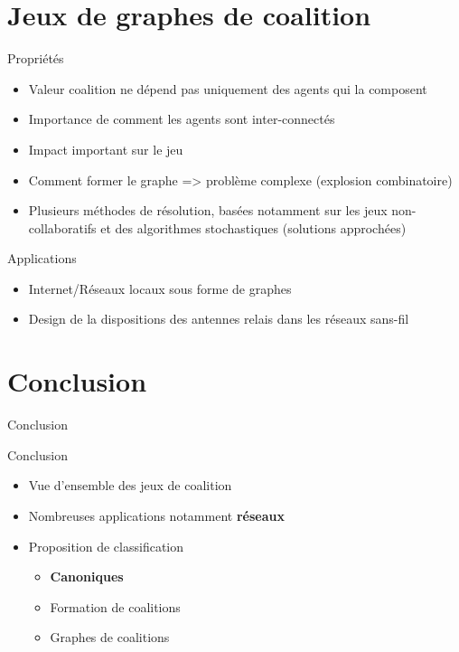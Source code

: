 \documentclass{isimabeamer}
\begin{document}
\section{Jeux de graphes de coalition}
\begin{frame}
\begin{block}{Propriétés}
\begin{itemize}
    \item Valeur coalition ne dépend pas uniquement des agents qui la composent
    \item Importance de comment les agents sont inter-connectés
    \item Impact important sur le jeu
    \item Comment former le graphe => problème complexe (explosion combinatoire)
    \item Plusieurs méthodes de résolution, basées notamment sur les jeux non-collaboratifs et des algorithmes stochastiques (solutions approchées)
\end{itemize}
\end{block}

\begin{block}{Applications}
\begin{itemize}
    \item Internet/Réseaux locaux sous forme de graphes 
    \item Design de la dispositions des antennes relais dans les réseaux sans-fil
\end{itemize}
\end{block}
\end{frame}




\section{Conclusion}

\begin{frame}{Conclusion}
\begin{block}{Conclusion}
\begin{itemize}
    \item Vue d'ensemble des jeux de coalition
    \item Nombreuses applications notamment \textbf{réseaux} 
    \item Proposition de classification
    \begin{itemize}
        \item \textbf{Canoniques}
        \item Formation de coalitions
        \item Graphes de coalitions
    \end{itemize}
\end{itemize}
\end{block}
\end{frame}
\end{document}
